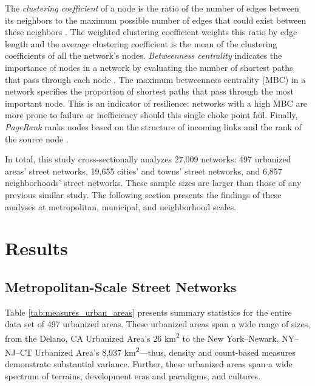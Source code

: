 \documentclass[Afour,sageh,times]{sagej}
\renewcommand{\cite}{\citep}
\begin{document}
The \emph{clustering coefficient} of a node is the ratio of the number of edges between its neighbors to the maximum possible number of edges that could exist between these neighbors \cite{jiang_topological_2004, opsahl_clustering_2009}. The weighted clustering coefficient weights this ratio by edge length and the average clustering coefficient is the mean of the clustering coefficients of all the network's nodes. \emph{Betweenness centrality} indicates the importance of nodes in a network by evaluating the number of shortest paths that pass through each node \cite{barthelemy_betweenness_2004,huang_trajgraph:_2016, zhong_revealing_2017}. The maximum betweenness centrality (MBC) in a network specifies the proportion of shortest paths that pass through the most important node. This is an indicator of resilience: networks with a high MBC are more prone to failure or inefficiency should this single choke point fail. Finally, \emph{PageRank} ranks nodes based on the structure of incoming links and the rank of the source node \cite{brin_anatomy_1998, jiang_predicting_2008, agryzkov_algorithm_2012, chin_geographically_2015, gleich_pagerank_2015}.

In total, this study cross-sectionally analyzes 27,009 networks: 497 urbanized areas' street networks, 19,655 cities' and towns' street networks, and 6,857 neighborhoods' street networks. These sample sizes are larger than those of any previous similar study. The following section presents the findings of these analyses at metropolitan, municipal, and neighborhood scales.


\section{Results}

\subsection{Metropolitan-Scale Street Networks}

Table \ref{tab:measures_urban_areas} presents summary statistics for the entire data set of 497 urbanized areas. These urbanized areas span a wide range of sizes, from the Delano, CA Urbanized Area's 26 km\textsuperscript{2} to the New York--Newark, NY--NJ--CT Urbanized Area's 8,937 km\textsuperscript{2}---thus, density and count-based measures demonstrate substantial variance. Further, these urbanized areas span a wide spectrum of terrains, development eras and paradigms, and cultures.
\end{document}
